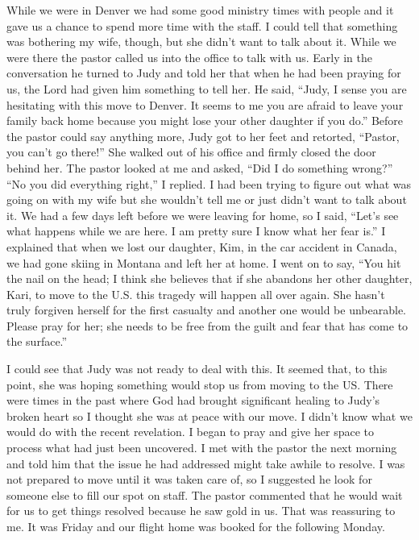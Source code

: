 \documentclass[twoside, 12pt]{book}
\begin{document}
While we were in Denver we had some good ministry times with people and it gave us a chance to spend more time with the staff. I could tell that something was bothering my wife, though, but she didn’t want to talk about it. While we were there the pastor called us into the office to talk with us. Early in the conversation he turned to Judy and told her that when he had been praying for us, the Lord had given him something to tell her. He said, “Judy, I sense you are hesitating with this move to Denver. It seems to me you are afraid to leave your family back home because you might lose your other daughter if you do.” Before the pastor could say anything more, Judy got to her feet and retorted, “Pastor, you can’t go there!” She walked out of his office and firmly closed the door behind her. The pastor looked at me and asked, “Did I do something wrong?” “No you did everything right,” I replied. I had been trying to figure out what was going on with my wife but she wouldn’t tell me or just didn’t want to talk about it. We had a few days left before we were leaving for home, so I said, “Let’s see what happens while we are here. I am pretty sure I know what her fear is.” I explained that when we lost our daughter, Kim, in the car accident in Canada, we had gone skiing in Montana and left her at home. I went on to say, “You hit the nail on the head; I think she believes that if she abandons her other daughter, Kari, to move to the U.S. this tragedy will happen all over again. She hasn’t truly forgiven herself for the first casualty and another one would be unbearable. Please pray for her; she needs to be free from the guilt and fear that has come to the surface.”

I could see that Judy was not ready to deal with this. It seemed that, to this point, she was hoping something would stop us from moving to the US. There were times in the past where God had brought significant healing to Judy’s broken heart so I thought she was at peace with our move. I didn’t know what we would do with the recent revelation. I began to pray and give her space to process what had just been uncovered. I met with the pastor the next morning and told him that the issue he had addressed might take awhile to resolve. I was not prepared to move until it was taken care of, so I suggested he look for someone else to fill our spot on staff. The pastor commented that he would wait for us to get things resolved because he saw gold in us. That was reassuring to me. It was Friday and our flight home was booked for the following Monday.
\end{document}
